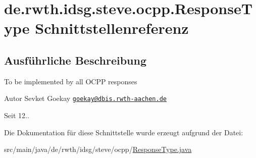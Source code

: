 \hypertarget{interfacede_1_1rwth_1_1idsg_1_1steve_1_1ocpp_1_1_response_type}{\section{de.\-rwth.\-idsg.\-steve.\-ocpp.\-Response\-Type Schnittstellenreferenz}
\label{interfacede_1_1rwth_1_1idsg_1_1steve_1_1ocpp_1_1_response_type}
}


\subsection{Ausführliche Beschreibung}
To be implemented by all O\-C\-P\-P responses

\begin{DoxyAuthor}{Autor}
Sevket Goekay \href{mailto:goekay@dbis.rwth-aachen.de}{\tt goekay@dbis.\-rwth-\/aachen.\-de} 
\end{DoxyAuthor}
\begin{DoxySince}{Seit}
12.. 
\end{DoxySince}


Die Dokumentation für diese Schnittstelle wurde erzeugt aufgrund der Datei\-:\begin{DoxyCompactItemize}
\item 
src/main/java/de/rwth/idsg/steve/ocpp/\hyperlink{_response_type_8java}{Response\-Type.\-java}\end{DoxyCompactItemize}
